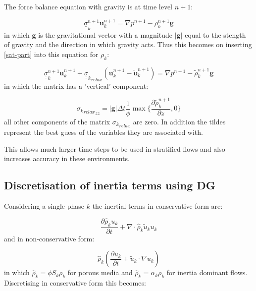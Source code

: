 The force balance equation with gravity is at time level $n+1$: 

\begin{equation}
{\underline {\underline\sigma}}_k^{n+1} {\mathbf u}_k^{n+1} = \nabla p^{n+1} - \rho_k^{n+1} {\mathbf g} 
\end{equation}
in which ${\mathbf g}$ is the gravitational vector with a 
magnitude $\vert{\mathbf g}\vert$ 
equal to the stength of gravity and the direction in which gravity acts. 
Thus this becomes on inserting \ref{sat-part} into this equation 
for $\rho_k$:


\begin{equation}
{\underline {\underline\sigma}}_k^{n+1} {\mathbf u}_k^{n+1} 
+  {{\underline {\underline\sigma}}_k}_{relax} 
({\mathbf u}_k^{n+1} - {\tilde {\mathbf u}}_k^{n+1}) 
= \nabla p^{n+1} 
-
{\tilde \rho}_k^{n+1} {\mathbf g} 
\end{equation}
in which the matrix has a 'vertical' component: 

\begin{equation}
{{\sigma_k}_{relax}}_{zz} = \vert{\mathbf g}\vert  \Delta t 
\frac{1}{ \phi } 
\max\{ \frac{\partial  {\tilde \rho}_k^{n+1}}{\partial z}, 0\} 
\end{equation}
all other components of the matrix ${{\sigma_k}_{relax}}$ are zero. 
In addition the tildes represent the best guess of 
the variables they are associated with. 

This allows much larger time steps to be used in stratified 
flows and also increases accuracy in these environments. 



\subsection{Discretisation of inertia terms using DG} 
Considering a single phase $k$ the inertial 
terms in conservative form are: 

\begin{equation}
\frac{\partial \hat\rho_k u_k}{\partial t} 
+ \nabla \cdot \hat\rho_k \tilde u_k  u_k 
\label{inertia-eqns-cons} 
\end{equation}
and in non-conservative form: 

\begin{equation}
\hat\rho_k \left(\frac{\partial u_k}{\partial t} 
+  \tilde u_k\cdot \nabla u_k \right) 
\label{inertia-eqns-non-cons} 
\end{equation}
in which $\hat\rho_k= \phi S_k \rho_k$ for porous 
media and $\hat\rho_k= \alpha_k \rho_k$ for inertia dominant 
flows. 
Discretising in conservative form this becomes: 


